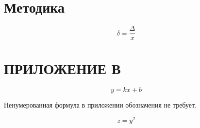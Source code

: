 
\section{Методика}

\begin{equation}
  \delta = \frac{\Delta}{x}
\end{equation}

\section*{ПРИЛОЖЕНИЕ В}

\begin{equation}
  y = kx + b
\end{equation}

Ненумерованная формула в приложении обозначения не требует.

\begin{equation*}
  z = y^2
\end{equation*}
